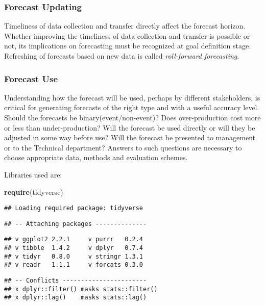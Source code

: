 \documentclass[]{article}
\newenvironment{Shaded}{\begin{snugshade}}{\end{snugshade}}
\newcommand{\KeywordTok}[1]{\textcolor[rgb]{0.13,0.29,0.53}{\textbf{#1}}}
\newcommand{\NormalTok}[1]{#1}
\begin{document}
\subsubsection{Forecast Updating}\label{forecast-updating}

Timeliness of data collection and transfer directly affect the forecast
horizon. Whether improving the timeliness of data collection and
transfer is possible or not, its implications on forecasting must be
recognized at goal definition stage. Refreshing of forecasts based on
new data is called \emph{roll-forward forecasting}.

\subsubsection{Forecast Use}\label{forecast-use}

Understanding how the forecast will be used, perhaps by different
stakeholders, is critical for generating forecasts of the right type and
with a useful accuracy level. Should the forecasts be
binary(event/non-event)? Does over-production cost more or less than
under-production? Will the forecast be used directly or will they be
adjusted in some way before use? Will the forecast be presented to
management or to the Technical department? Answers to such questions are
necessary to choose appropriate data, methods and evaluation schemes.

Libraries used are:

\begin{Shaded}
\begin{Highlighting}[]
\KeywordTok{require}\NormalTok{(tidyverse) }
\end{Highlighting}
\end{Shaded}

\begin{verbatim}
## Loading required package: tidyverse
\end{verbatim}

\begin{verbatim}
## -- Attaching packages --------------
\end{verbatim}

\begin{verbatim}
## v ggplot2 2.2.1     v purrr   0.2.4
## v tibble  1.4.2     v dplyr   0.7.4
## v tidyr   0.8.0     v stringr 1.3.1
## v readr   1.1.1     v forcats 0.3.0
\end{verbatim}

\begin{verbatim}
## -- Conflicts -----------------------
## x dplyr::filter() masks stats::filter()
## x dplyr::lag()    masks stats::lag()
\end{verbatim}
\end{document}
